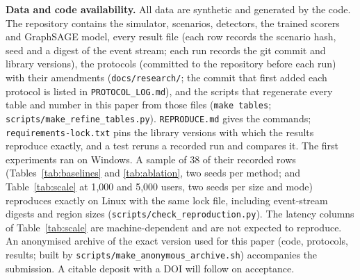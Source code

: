 \textbf{Data and code availability.} All data are synthetic and generated by
the code. The repository contains the simulator, scenarios, detectors, the
trained scorers and GraphSAGE model, every result file (each row records the
scenario hash, seed and a digest of the event stream; each run records the git
commit and library versions), the protocols (committed to the repository before each run) with their
amendments (\texttt{docs/research/}; the commit that first added each protocol
is listed in \texttt{PROTOCOL\_LOG.md}), and the scripts that regenerate every
table and number in this paper from those files (\texttt{make tables};
\texttt{scripts/make\_refine\_tables.py}). \texttt{REPRODUCE.md} gives the
commands; \texttt{requirements-lock.txt} pins the library versions with which
the results reproduce exactly, and a test reruns a recorded run and compares
it. The first experiments ran on Windows. A sample of 38 of their recorded rows
(Tables~\ref{tab:baselines} and \ref{tab:ablation}, two seeds per method; and
Table~\ref{tab:scale} at 1{,}000 and 5{,}000 users, two seeds per size and mode)
reproduces exactly on Linux with the same lock file, including event-stream
digests and region sizes (\texttt{scripts/check\_reproduction.py}). The latency
columns of Table~\ref{tab:scale} are machine-dependent and are not expected to
reproduce. An anonymised archive of the exact
version used for this paper (code, protocols, results; built by
\texttt{scripts/make\_anonymous\_archive.sh}) accompanies the submission. A
citable deposit with a DOI will follow on acceptance.
